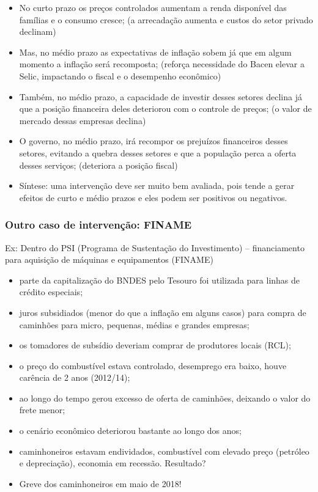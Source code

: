 \documentclass[a4paper,12pt]{article}[abntex2]
\begin{document}
\begin{itemize}
    \item No curto prazo os preços controlados aumentam a renda disponível das famílias e o consumo cresce; (a arrecadação aumenta e custos do setor privado declinam)
    \item Mas, no médio prazo as expectativas de inflação sobem já que em algum momento a inflação será recomposta; (reforça necessidade do Bacen elevar a Selic, impactando o fiscal e o desempenho econômico)
    \item Também, no médio prazo, a capacidade de investir desses setores declina já que a posição financeira deles deteriorou com o controle de preços; (o valor de mercado dessas empresas declina)
    \item O governo, no médio prazo, irá recompor os prejuízos financeiros desses setores, evitando a quebra desses setores e que a população perca a oferta desses serviços; (deteriora a posição fiscal)
    \item Síntese: uma intervenção deve ser muito bem avaliada, pois tende a gerar efeitos de curto e médio prazos e eles podem ser positivos ou negativos.
\end{itemize}

\subsubsection{\textbf{Outro caso de intervenção: FINAME}}
Ex: Dentro do PSI (Programa de Sustentação do Investimento) – financiamento para aquisição de máquinas e equipamentos (FINAME)

\begin{itemize}
    \item parte da capitalização do BNDES pelo Tesouro foi utilizada para linhas de crédito especiais;
    \item juros subsidiados (menor do que a inflação em alguns casos) para compra de caminhões para micro, pequenas, médias e grandes empresas;
    \item os tomadores de subsídio deveriam comprar de produtores locais (RCL);
    \item o preço do combustível estava controlado, desemprego era baixo, houve carência de 2 anos (2012/14);
    \item ao longo do tempo gerou excesso de oferta de caminhões, deixando o valor do frete menor;
    \item o cenário econômico deteriorou bastante ao longo dos anos;
    \item caminhoneiros estavam endividados, combustível com elevado preço (petróleo e depreciação), economia em recessão. Resultado?
    \item Greve dos caminhoneiros em maio de 2018!
\end{itemize}
\end{document}

